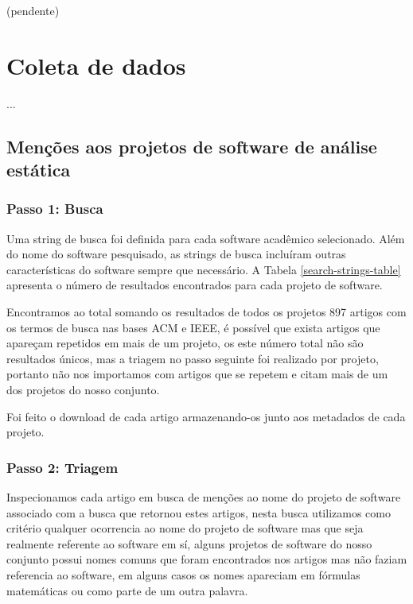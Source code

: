 (pendente)

\section{Coleta de dados}

...

\subsection{Menções aos projetos de software de análise estática}

\subsubsection{Passo 1: Busca}

Uma string de busca foi definida para cada software acadêmico selecionado.
Além do nome do software pesquisado, as strings de busca incluíram outras
características do software sempre que necessário.
A Tabela \ref{search-strings-table} apresenta o número de resultados encontrados para cada
projeto de software.



Encontramos ao total somando os resultados de todos os projetos 897 artigos
com os termos de busca nas bases ACM e IEEE, é possível que exista artigos
que apareçam repetidos em mais de um projeto, os este número total não
são resultados únicos, mas a triagem no passo seguinte foi realizado por
projeto, portanto não nos importamos com artigos que se repetem e citam
mais de um dos projetos do nosso conjunto.

Foi feito o download de cada artigo armazenando-os junto aos metadados
de cada projeto.

\subsubsection{Passo 2: Triagem}

Inspecionamos cada artigo em busca de menções ao nome do projeto de software
associado com a busca que retornou estes artigos, nesta busca utilizamos como
critério qualquer ocorrencia ao nome do projeto de software mas que seja realmente
referente ao software em sí, alguns projetos de software do nosso conjunto possui
nomes comuns que foram encontrados nos artigos mas não faziam referencia
ao software, em alguns casos os nomes apareciam em fórmulas matemáticas ou
como parte de um outra palavra.

